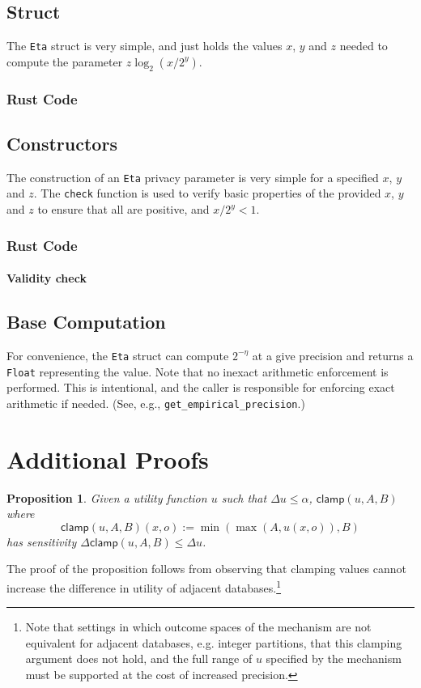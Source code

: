 \documentclass[11pt]{article}
\newtheorem{proposition}[theorem]{Proposition}
\theoremstyle{definition}
\begin{document}
\subsection{Struct}
The {\tt Eta} struct is very simple, and just holds the values $x$, $y$ and $z$ needed to compute the parameter $z\log_2(x/2^y)$.
\subsubsection{Rust Code}


\subsection{Constructors}
The construction of an {\tt Eta} privacy parameter is very simple for a specified $x$, $y$ and $z$. The {\tt check} function is used to verify basic properties of the provided $x$, $y$ and $z$ to ensure that all are positive, and $x/2^y < 1$.
\subsubsection{Rust Code}

\paragraph{Validity check}


\subsection{Base Computation}
For convenience, the {\tt Eta} struct can compute $2^{-\eta}$ at a give precision and returns a {\tt Float} representing the value. Note that no inexact arithmetic enforcement is performed. This is intentional, and the caller is responsible for enforcing exact arithmetic if needed. (See, e.g., {\tt get\_empirical\_precision}.)


\section{Additional Proofs}

\begin{proposition}\label{prop:clamp}
Given a utility function $u$ such that $\Delta u \leq \alpha$,  $\mathsf{clamp}(u, A, B)$ where  \[\mathsf{clamp}(u,A,B)(x,o):=  \min(\max(A,u(x,o)), B)\] has sensitivity $\Delta \mathsf{clamp}(u,A,B)\leq \Delta u$.
\end{proposition}
\noindent The proof of the proposition follows from observing that clamping values cannot increase the difference in utility of adjacent databases.\footnote{Note that settings in which outcome spaces of the mechanism are not equivalent for adjacent databases, e.g. integer partitions, that this clamping argument does not hold, and the full range of $u$ specified by the mechanism must be supported at the cost of increased precision.} 
\end{document}
